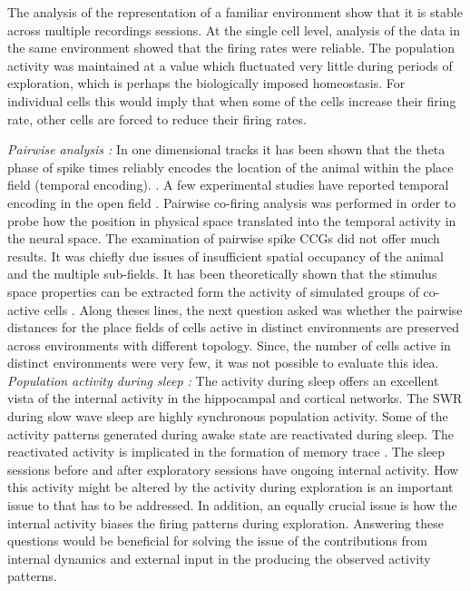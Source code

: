 The analysis of the representation of a familiar environment show that it is stable across multiple recordings sessions. At the single cell level, analysis of the data in the same environment showed that the firing rates were reliable. The population activity was maintained at a value which fluctuated very little during periods of exploration, which is perhaps the biologically imposed homeostasis. For individual cells this would imply that when some of the cells increase their firing rate, other cells are forced to reduce their firing rates. 

\emph{Pairwise analysis : }
In one dimensional tracks it has been shown that the theta phase of spike times reliably encodes the location of the animal within the place field (temporal encoding). \cite{O'Keefe1993, Skaggs1996c, Huxter2003}. A few experimental studies have reported temporal encoding in the open field \cite{Huxter2008a}. Pairwise co-firing analysis was performed in order to probe how the position in physical space translated into the temporal activity in the neural space. The examination of pairwise spike CCGs did not offer much results. It was chiefly due issues of insufficient spatial occupancy of the animal and the multiple sub-fields. It has been theoretically shown that the stimulus space properties can be extracted form the activity of simulated groups of co-active cells \cite{Curto2008}. Along theses lines, the next question asked was whether the pairwise distances for the place fields of cells active in distinct environments are preserved across environments with different topology. Since, the number of cells active in distinct environments were very few, it was not possible to evaluate this idea. \\

\emph{Population activity during sleep : }
The activity during sleep offers an excellent vista of the internal activity in the hippocampal and cortical networks. The SWR during slow wave sleep are highly synchronous population activity. Some of the activity patterns generated during awake state are reactivated during sleep. The reactivated activity is implicated in the formation of memory trace \cite{Buzsaki1989}. The sleep sessions before and after exploratory sessions have ongoing internal activity. How this activity might be altered by the activity during exploration is an important issue to that has to be addressed. In addition, an equally crucial issue is how the internal activity biases the firing patterns during exploration. Answering these questions would be beneficial for solving the issue of the contributions from internal dynamics and external input in the producing the observed activity patterns.  \\

